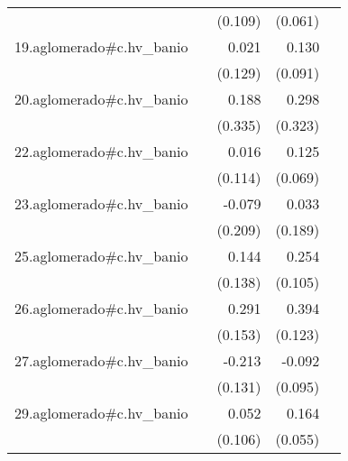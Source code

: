 {\begin{longtable}{l*{4}{D{.}{.}{-1}}}
            &                     &     (0.109)         &     (0.061)         &                     \\
\addlinespace
19.aglomerado#c.hv\_banio&                     &       0.021         &       0.130         &                     \\
            &                     &     (0.129)         &     (0.091)         &                     \\
\addlinespace
20.aglomerado#c.hv\_banio&                     &       0.188         &       0.298         &                     \\
            &                     &     (0.335)         &     (0.323)         &                     \\
\addlinespace
22.aglomerado#c.hv\_banio&                     &       0.016         &       0.125         &                     \\
            &                     &     (0.114)         &     (0.069)         &                     \\
\addlinespace
23.aglomerado#c.hv\_banio&                     &      -0.079         &       0.033         &                     \\
            &                     &     (0.209)         &     (0.189)         &                     \\
\addlinespace
25.aglomerado#c.hv\_banio&                     &       0.144         &       0.254\sym{*}  &                     \\
            &                     &     (0.138)         &     (0.105)         &                     \\
\addlinespace
26.aglomerado#c.hv\_banio&                     &       0.291         &       0.394\sym{**} &                     \\
            &                     &     (0.153)         &     (0.123)         &                     \\
\addlinespace
27.aglomerado#c.hv\_banio&                     &      -0.213         &      -0.092         &                     \\
            &                     &     (0.131)         &     (0.095)         &                     \\
\addlinespace
29.aglomerado#c.hv\_banio&                     &       0.052         &       0.164\sym{**} &                     \\
            &                     &     (0.106)         &     (0.055)         &                     \\

\end{longtable}}
